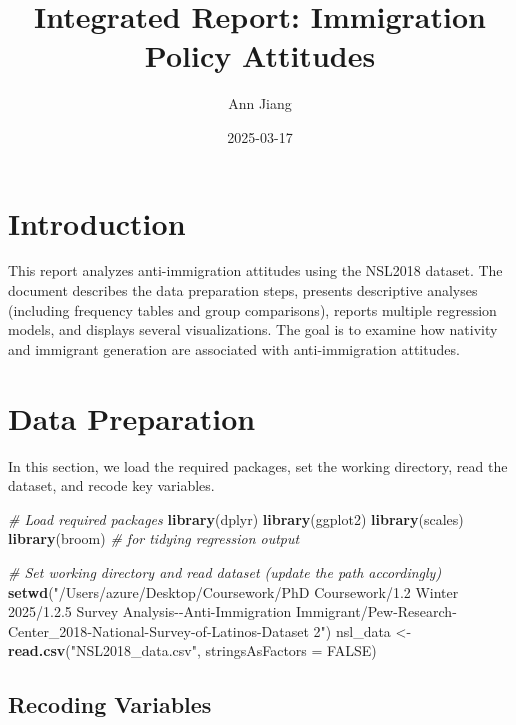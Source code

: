 \documentclass[
]{article}
\title{Integrated Report: Immigration Policy Attitudes}
\author{Ann Jiang}
\date{2025-03-17}
\newenvironment{Shaded}{\begin{snugshade}}{\end{snugshade}}
\newcommand{\AttributeTok}[1]{\textcolor[rgb]{0.13,0.29,0.53}{#1}}
\newcommand{\CommentTok}[1]{\textcolor[rgb]{0.56,0.35,0.01}{\textit{#1}}}
\newcommand{\ConstantTok}[1]{\textcolor[rgb]{0.56,0.35,0.01}{#1}}
\newcommand{\FunctionTok}[1]{\textcolor[rgb]{0.13,0.29,0.53}{\textbf{#1}}}
\newcommand{\NormalTok}[1]{#1}
\newcommand{\OtherTok}[1]{\textcolor[rgb]{0.56,0.35,0.01}{#1}}
\newcommand{\StringTok}[1]{\textcolor[rgb]{0.31,0.60,0.02}{#1}}
\begin{document}
\maketitle

\section{Introduction}\label{introduction}

This report analyzes anti-immigration attitudes using the NSL2018
dataset. The document describes the data preparation steps, presents
descriptive analyses (including frequency tables and group comparisons),
reports multiple regression models, and displays several visualizations.
The goal is to examine how nativity and immigrant generation are
associated with anti-immigration attitudes.

\section{Data Preparation}\label{data-preparation}

In this section, we load the required packages, set the working
directory, read the dataset, and recode key variables.

\begin{Shaded}
\begin{Highlighting}[]
\CommentTok{\# Load required packages}
\FunctionTok{library}\NormalTok{(dplyr)}
\FunctionTok{library}\NormalTok{(ggplot2)}
\FunctionTok{library}\NormalTok{(scales)}
\FunctionTok{library}\NormalTok{(broom)  }\CommentTok{\# for tidying regression output}

\CommentTok{\# Set working directory and read dataset (update the path accordingly)}
\FunctionTok{setwd}\NormalTok{(}\StringTok{"/Users/azure/Desktop/Coursework/PhD Coursework/1.2 Winter 2025/1.2.5 Survey Analysis{-}{-}Anti{-}Immigration Immigrant/Pew{-}Research{-}Center\_2018{-}National{-}Survey{-}of{-}Latinos{-}Dataset 2"}\NormalTok{)}
\NormalTok{nsl\_data }\OtherTok{\textless{}{-}} \FunctionTok{read.csv}\NormalTok{(}\StringTok{"NSL2018\_data.csv"}\NormalTok{, }\AttributeTok{stringsAsFactors =} \ConstantTok{FALSE}\NormalTok{)}
\end{Highlighting}
\end{Shaded}

\subsection{Recoding Variables}\label{recoding-variables}
\end{document}
